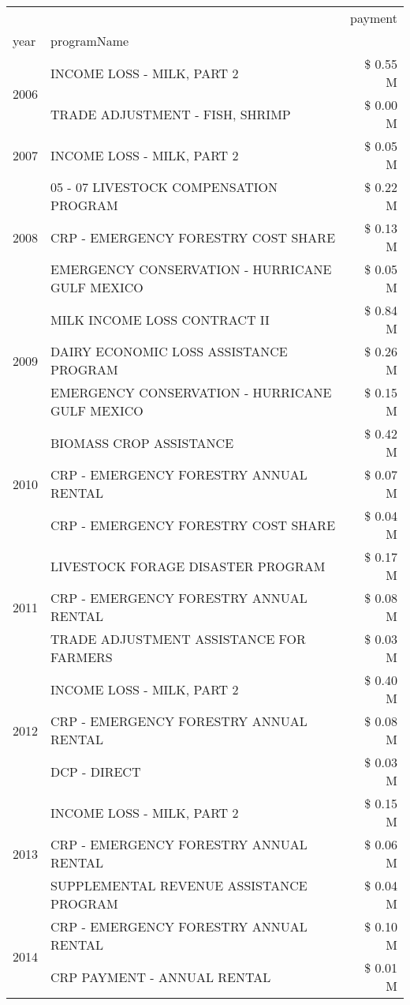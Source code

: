 \begin{tabular}{llr}
\toprule
 &  & payment \\
year & programName &  \\
\midrule
\multirow[t]{2}{*}{2006} & INCOME LOSS - MILK, PART 2 & \$ 0.55 M \\
 & TRADE ADJUSTMENT - FISH, SHRIMP & \$ 0.00 M \\
\cline{1-3}
2007 & INCOME LOSS - MILK, PART 2 & \$ 0.05 M \\
\cline{1-3}
\multirow[t]{3}{*}{2008} & 05 - 07 LIVESTOCK COMPENSATION PROGRAM & \$ 0.22 M \\
 & CRP - EMERGENCY FORESTRY COST SHARE & \$ 0.13 M \\
 & EMERGENCY CONSERVATION - HURRICANE GULF MEXICO & \$ 0.05 M \\
\cline{1-3}
\multirow[t]{3}{*}{2009} & MILK INCOME LOSS CONTRACT II & \$ 0.84 M \\
 & DAIRY ECONOMIC LOSS ASSISTANCE PROGRAM & \$ 0.26 M \\
 & EMERGENCY CONSERVATION - HURRICANE GULF MEXICO & \$ 0.15 M \\
\cline{1-3}
\multirow[t]{3}{*}{2010} & BIOMASS CROP ASSISTANCE & \$ 0.42 M \\
 & CRP - EMERGENCY FORESTRY ANNUAL RENTAL & \$ 0.07 M \\
 & CRP - EMERGENCY FORESTRY COST SHARE & \$ 0.04 M \\
\cline{1-3}
\multirow[t]{3}{*}{2011} & LIVESTOCK FORAGE DISASTER PROGRAM & \$ 0.17 M \\
 & CRP - EMERGENCY FORESTRY ANNUAL RENTAL & \$ 0.08 M \\
 & TRADE ADJUSTMENT ASSISTANCE FOR FARMERS & \$ 0.03 M \\
\cline{1-3}
\multirow[t]{3}{*}{2012} & INCOME LOSS - MILK, PART 2 & \$ 0.40 M \\
 & CRP - EMERGENCY FORESTRY ANNUAL RENTAL & \$ 0.08 M \\
 & DCP - DIRECT & \$ 0.03 M \\
\cline{1-3}
\multirow[t]{3}{*}{2013} & INCOME LOSS - MILK, PART 2 & \$ 0.15 M \\
 & CRP - EMERGENCY FORESTRY ANNUAL RENTAL & \$ 0.06 M \\
 & SUPPLEMENTAL REVENUE ASSISTANCE PROGRAM & \$ 0.04 M \\
\cline{1-3}
\multirow[t]{3}{*}{2014} & CRP - EMERGENCY FORESTRY ANNUAL RENTAL & \$ 0.10 M \\
 & CRP PAYMENT - ANNUAL RENTAL & \$ 0.01 M \\

\end{tabular}
